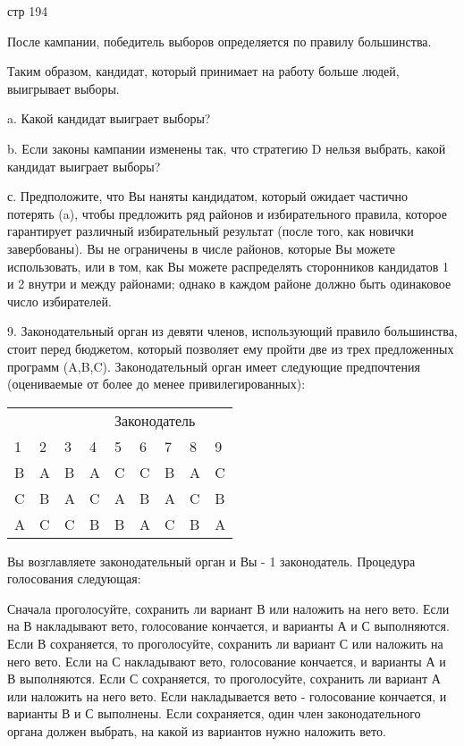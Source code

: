 \documentclass[a4paper,12pt]{article}
\begin{document}
стр 194

После кампании, победитель выборов определяется по
правилу большинства.

Таким образом, кандидат, который принимает на
работу больше людей, выигрывает выборы.

a. Какой кандидат выиграет выборы?

b. Если законы кампании изменены так, что стратегию
D нельзя выбрать, какой кандидат выиграет выборы?

с. Предположите, что Вы наняты кандидатом, который
ожидает частично потерять (a), чтобы предложить ряд
районов и избирательного правила, которое
гарантирует различный избирательный результат
(после того, как новички завербованы). Вы не
ограничены в числе районов, которые Вы можете
использовать, или в том, как Вы можете распределять
сторонников кандидатов 1 и 2 внутри и между
районами; однако в каждом районе должно быть
одинаковое число избирателей.

9. Законодательный орган из девяти членов,
использующий правило большинства, стоит перед
бюджетом, который позволяет ему пройти две из трех
предложенных программ (A,B,C). Законодательный
орган имеет следующие предпочтения (оцениваемые от
более до менее привилегированных):

\begin{tabular}{lllllllll}
\multicolumn{9}{l}{\ \ \ \ \ \ \ \ \ \ \ \ \ \ Законодатель} \\
1 & 2 & 3 & 4 & 5 & 6 & 7 & 8 & 9 \\ B & A & B & A & C & C & B & A & C \\
C & B & A & C & A & B & A & C & B \\ A & C & C & B
& B & A & C & B & A\end{tabular}

Вы возглавляете законодательный орган и Вы - 1
законодатель. Процедура голосования следующая:

Сначала проголосуйте, сохранить ли вариант В или
наложить на него вето. Если на В накладывают вето,
голосование кончается, и варианты А и С
выполняются. Если В сохраняется, то проголосуйте,
сохранить ли вариант С или наложить на него вето.
Если на С накладывают вето, голосование кончается,
и варианты А и В выполняются. Если С сохраняется,
то проголосуйте, сохранить ли вариант А или
наложить на него вето. Если накладывается вето -
голосование кончается, и варианты В и С выполнены.
Если сохраняется, один член законодательного органа
должен выбрать, на какой из вариантов нужно
наложить вето.
\end{document}
